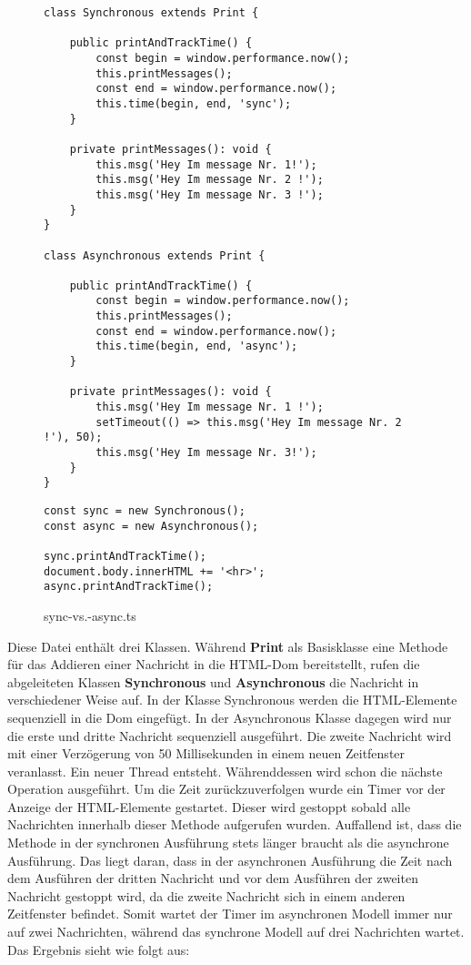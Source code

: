 \begin{figure}[H]
\begin{lstlisting}
class Synchronous extends Print {

    public printAndTrackTime() {
        const begin = window.performance.now();
        this.printMessages();
        const end = window.performance.now();
        this.time(begin, end, 'sync');
    }

    private printMessages(): void {
        this.msg('Hey Im message Nr. 1!');
        this.msg('Hey Im message Nr. 2 !');
        this.msg('Hey Im message Nr. 3 !');
    }
}

class Asynchronous extends Print {

    public printAndTrackTime() {
        const begin = window.performance.now();
        this.printMessages();
        const end = window.performance.now();
        this.time(begin, end, 'async');
    }

    private printMessages(): void {
        this.msg('Hey Im message Nr. 1 !');
        setTimeout(() => this.msg('Hey Im message Nr. 2 !'), 50);
        this.msg('Hey Im message Nr. 3!');
    }
}
\end{lstlisting}
\end{figure}

\begin{figure}[H]
\begin{lstlisting}
const sync = new Synchronous();
const async = new Asynchronous();

sync.printAndTrackTime();
document.body.innerHTML += '<hr>';
async.printAndTrackTime();
\end{lstlisting}
\caption{sync-vs.-async.ts}
\end{figure}

\noindent
Diese Datei enthält drei Klassen. Während \textbf{Print} als Basisklasse eine Methode für das Addieren einer Nachricht in die HTML-Dom bereitstellt, rufen die abgeleiteten Klassen \textbf{Synchronous} und \textbf{Asynchronous} die Nachricht in verschiedener Weise auf. In der Klasse Synchronous werden die HTML-Elemente sequenziell in die Dom eingefügt. In der Asynchronous Klasse dagegen wird nur die erste und dritte Nachricht sequenziell ausgeführt. Die zweite Nachricht wird mit einer Verzögerung von 50 Millisekunden in einem neuen Zeitfenster veranlasst. Ein neuer Thread entsteht. Währenddessen wird schon die nächste Operation ausgeführt. Um die Zeit zurückzuverfolgen wurde ein Timer vor der Anzeige der HTML-Elemente gestartet. Dieser wird gestoppt sobald alle Nachrichten innerhalb dieser Methode aufgerufen wurden. Auffallend ist, dass die Methode in der synchronen Ausführung stets länger braucht als die asynchrone Ausführung. Das liegt daran, dass in der asynchronen Ausführung die Zeit nach dem Ausführen der dritten Nachricht und vor dem Ausführen der zweiten Nachricht gestoppt wird, da die zweite Nachricht sich in einem anderen Zeitfenster befindet. Somit wartet der Timer im asynchronen Modell immer nur auf zwei Nachrichten, während das synchrone Modell auf drei Nachrichten wartet.
Das Ergebnis sieht wie folgt aus:

